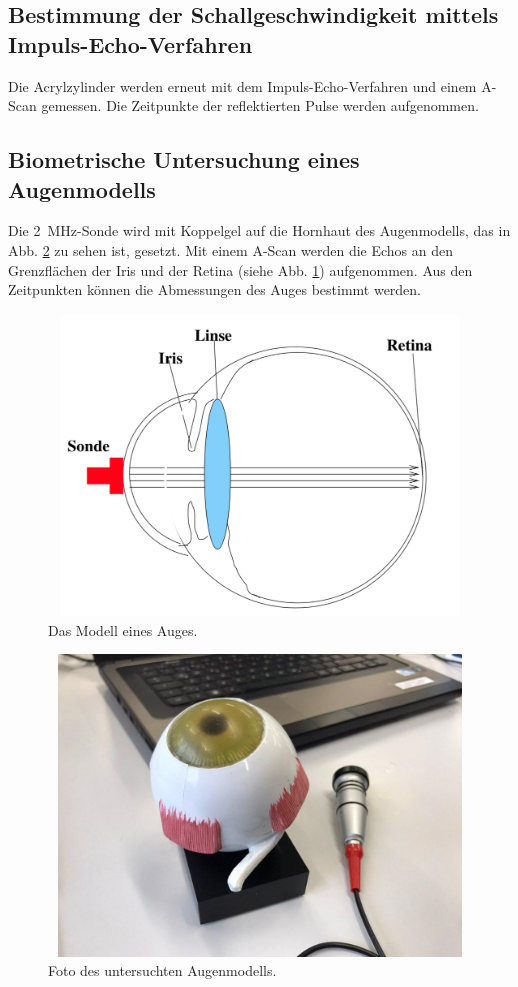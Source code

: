 \subsection{Bestimmung der Schallgeschwindigkeit mittels Impuls-Echo-Verfahren}
Die Acrylzylinder werden erneut mit dem Impuls-Echo-Verfahren
und einem A-Scan gemessen. Die Zeitpunkte der reflektierten Pulse
werden aufgenommen.

\subsection{Biometrische Untersuchung eines Augenmodells}
Die \SI{2}{\mega\hertz}-Sonde wird mit Koppelgel auf die
Hornhaut des Augenmodells, das in Abb. \ref{fig:bild_augenmodell} zu sehen ist, gesetzt. Mit einem A-Scan werden die
Echos an den Grenzflächen der Iris und der Retina (siehe Abb. \ref{fig:augenmodell}) aufgenommen.
Aus den Zeitpunkten können die Abmessungen des Auges bestimmt 
werden.
\begin{figure}
    \centering
    \includegraphics[width=12cm, height=8cm]{build/Augenmodell.png}
    \caption{Das Modell eines Auges. \cite{US1}}
    \label{fig:augenmodell}
\end{figure}
\begin{figure}
    \centering
    \includegraphics[width=12cm, height=8cm]{build/BildAuge.jpg}
    \caption{Foto des untersuchten Augenmodells.}
    \label{fig:bild_augenmodell}
\end{figure}